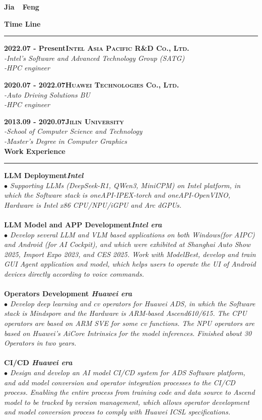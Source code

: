 \documentclass[a4paper,12pt,final]{memoir}
\newcommand{\myThemeColor}{RoyalBlue}
\newcommand{\SmallSep}{\vspace{0.9em}}
\newcommand{\CVSection}[1]
	{\Large\textbf{#1}\par
	\vspace{0.2cm}\normalsize\normalfont}
\newcommand{\CVItem}[1]
	{\textbf{\color{\myThemeColor} #1}}
\begin{document}
\Huge\bfseries {\color{\myThemeColor} Jia~~Feng}\\
\normalsize\normalfont

\CVSection{Time Line}
\hrule
\SmallSep

\CVItem{2022.07 - Present\hfill\textsc{Intel Asia Pacific R\&D Co., Ltd.}}\\
\textit{-Intel's Software and Advanced Technology Group (SATG)}\\
\textit{-HPC engineer}

\CVItem{2020.07 - 2022.07\hfill\textsc{Huawei Technologies Co., Ltd.}}\\
\textit{-Auto Driving Solutions BU}\\
\textit{-HPC engineer}

\CVItem{2013.09 - 2020.07\hfill\textsc{Jilin University}}\\
\textit{-School of Computer Science and Technology}\\
\textit{-Master's Degree in Computer Graphics}
\\

\CVSection{Work Experience}
\hrule
\SmallSep
\CVItem{LLM Deployment\hfill\emph{Intel}}\\
\textit{$\bullet$ Supporting LLMs (DeepSeek-R1, QWen3, MiniCPM) on Intel platform, in which the Software stack is oneAPI-IPEX-torch and oneAPI-OpenVINO, Hardware is Intel x86 CPU/NPU/iGPU and Arc dGPUs. }
\\
\\
\CVItem{LLM Model and APP Development\hfill\emph{Intel era}}\\
\textit{$\bullet$ 
Develop several LLM and VLM based applications on both Windows(for AIPC) and Android (for AI Cockpit), and which were exhibited at Shanghai Auto Show 2025, Import Expo 2023, and CES 2025. Work with ModelBest, develop and train GUI Agent application and model, which helps users to operate the UI of Android devices directly according to voice commands.} 
\\
\\
\CVItem{Operators Development \hfill\emph{Huawei era}}\\
\textit{$\bullet$ Develop deep learning and cv operators for Huawei ADS, in which the Software stack is Mindspore and the Hardware is ARM-based Ascend610/615. The CPU operators are based on ARM SVE for some cv functions. The NPU operators are based on Huawei’s AiCore Intrinsics for the model inferences. Finished about 30 Operators in two years.}
\\
\\
\CVItem{CI/CD \hfill\emph{Huawei era}}\\
\textit{$\bullet$ 
Design and develop an AI model CI/CD system for ADS Software platform, and add model conversion and operator integration processes to the CI/CD process. Enabling the entire process from training code and data source to Ascend model to be tracked by version management, which allows operator development and model conversion process to comply with Huawei ICSL specifications. }
\\
\\
\end{document}
